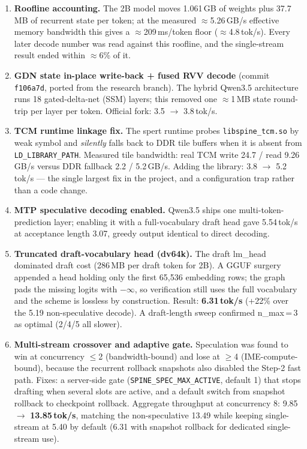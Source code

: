 \documentclass[10pt,twocolumn]{article}
\begin{document}
\begin{enumerate}[label=\textbf{Step \arabic*.},leftmargin=3.2em]
\item \textbf{Roofline accounting.} The 2B model moves 1.061\,GB of weights plus 37.7\,MB of recurrent state per token; at the measured $\approx$5.26\,GB/s effective memory bandwidth this gives a $\approx$209\,ms/token floor ($\approx$4.8\,tok/s). Every later decode number was read against this roofline, and the single-stream result ended within $\approx$6\% of it.
\item \textbf{GDN state in-place write-back + fused RVV decode} (commit \texttt{f106a7d}, ported from the research branch). The hybrid Qwen3.5 architecture runs 18 gated-delta-net (SSM) layers; this removed one $\approx$1\,MB state round-trip per layer per token. Official fork: 3.5 $\to$ 3.8\,tok/s.
\item \textbf{TCM runtime linkage fix.} The spert runtime probes \texttt{libspine\_tcm.so} by weak symbol and \emph{silently} falls back to DDR tile buffers when it is absent from \texttt{LD\_LIBRARY\_PATH}. Measured tile bandwidth: real TCM write 24.7 / read 9.26\,GB/s versus DDR fallback 2.2 / 5.2\,GB/s. Adding the library: 3.8 $\to$ 5.2\,tok/s --- the single largest fix in the project, and a configuration trap rather than a code change.
\item \textbf{MTP speculative decoding enabled.} Qwen3.5 ships one multi-token-prediction layer; enabling it with a full-vocabulary draft head gave 5.54\,tok/s at acceptance length 3.07, greedy output identical to direct decoding.
\item \textbf{Truncated draft-vocabulary head (dv64k).} The draft lm\_head dominated draft cost (286\,MB per draft token for 2B). A GGUF surgery appended a head holding only the first 65{,}536 embedding rows; the graph pads the missing logits with $-\infty$, so verification still uses the full vocabulary and the scheme is lossless by construction. Result: \textbf{6.31\,tok/s} (+22\% over the 5.19 non-speculative decode). A draft-length sweep confirmed n\_max\,=\,3 as optimal (2/4/5 all slower).
\item \textbf{Multi-stream crossover and adaptive gate.} Speculation was found to win at concurrency $\leq$2 (bandwidth-bound) and lose at $\geq$4 (IME-compute-bound), because the recurrent rollback snapshots also disabled the Step-2 fast path. Fixes: a server-side gate (\texttt{SPINE\_SPEC\_MAX\_ACTIVE}, default 1) that stops drafting when several slots are active, and a default switch from snapshot rollback to checkpoint rollback. Aggregate throughput at concurrency 8: 9.85 $\to$ \textbf{13.85\,tok/s}, matching the non-speculative 13.49 while keeping single-stream at 5.40 by default (6.31 with snapshot rollback for dedicated single-stream use).

\end{enumerate}
\end{document}

